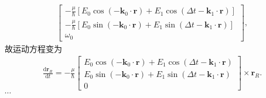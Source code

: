 \documentclass[twoside]{note}
\begin{document}
\begin{sol}
\begin{align}
\begin{bmatrix}
            -\frac{\mu}{\hbar}[E_0\cos(-\bm{k}_0\cdot\bm{r})+E_1\cos(\Delta t-\bm{k}_1\cdot\bm{r})]\\
            -\frac{\mu}{\hbar}[E_0\sin(-\bm{k}_0\cdot\bm{r})+E_1\sin(\Delta t-\bm{k}_1\cdot\bm{r})]\\
            \omega_0
        \end{bmatrix},
    \end{align}
    故运动方程变为
    \begin{align}
        \frac{\mathrm{d}\bm{r}_R}{\mathrm{d}t}=-\frac{\mu}{\hbar}\begin{bmatrix}
            E_0\cos(-\bm{k}_0\cdot\bm{r})+E_1\cos(\Delta t-\bm{k}_1\cdot\bm{r})\\
            E_0\sin(-\bm{k}_0\cdot\bm{r})+E_1\sin(\Delta t-\bm{k}_1\cdot\bm{r})\\
            0
        \end{bmatrix}\times\bm{r}_R.
    \end{align}
    $\cdots$
\end{sol}
\end{document}

